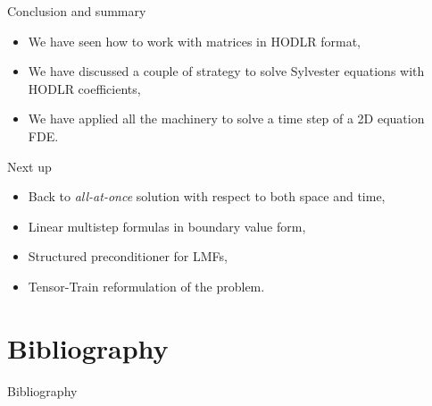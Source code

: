 \documentclass[aspectratio=169,xcolor=dvipsnames]{beamer}
\newcommand\unnumbered{\setbeamertemplate{footline}{}}%
\begin{document}
\begin{frame}{Conclusion and summary}
	
	\begin{itemize}
		\item[\textcolor{success}{\faCheckCircle}] We have seen how to work with matrices in HODLR format,
		\item[\textcolor{success}{\faCheckCircle}] We have discussed a couple of strategy to solve Sylvester equations with HODLR coefficients,
		\item[\textcolor{success}{\faCheckCircle}] We have applied all the machinery to solve a time step of a 2D equation FDE.
	\end{itemize}
	\vfill

	Next up
	\begin{itemize}
		\item[\textcolor{todo}{\faClipboardList}] Back to \emph{all-at-once} solution with respect to both space and time,
		\item[\textcolor{todo}{\faClipboardList}] Linear multistep formulas in boundary value form,
		\item[\textcolor{todo}{\faClipboardList}] Structured preconditioner for LMFs,
		\item[\textcolor{todo}{\faClipboardList}] Tensor-Train reformulation of the problem.
	\end{itemize}
	
\end{frame}

	
	\section*{Bibliography}
	{\unnumbered
		\begin{frame}{Bibliography}
			\small
			\printbibliography
			
		\end{frame}
	}
\end{document}
